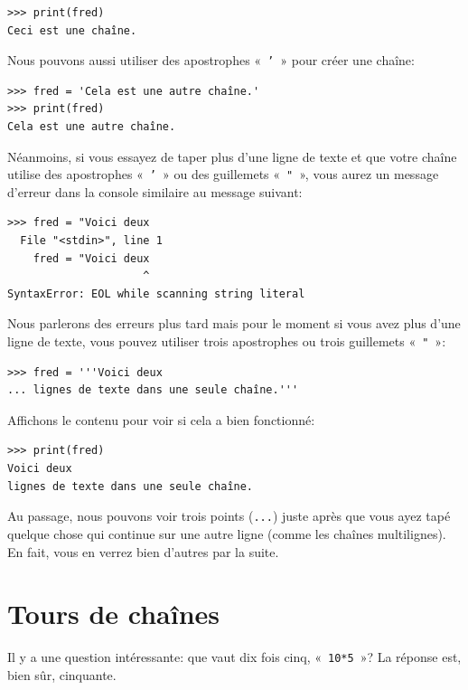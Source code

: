 \begin{Verbatim}[frame=single,rulecolor=\color{mbleu}, label=à taper]
>>> print(fred)
Ceci est une chaîne.
\end{Verbatim}

Nous pouvons aussi utiliser des apostrophes «~\texttt{'}~» pour créer une chaîne:

\begin{Verbatim}[frame=single,rulecolor=\color{mbleu}, label=à taper]
>>> fred = 'Cela est une autre chaîne.'
>>> print(fred)
Cela est une autre chaîne.
\end{Verbatim}

Néanmoins, si vous essayez de taper plus d'une ligne de texte et que votre chaîne utilise des apostrophes «~\texttt{'}~» ou des guillemets «~\texttt{"}~», vous aurez un message d'erreur dans la console similaire au message suivant:

\begin{Verbatim}[frame=single,rulecolor=\color{red}, label=erreur]
>>> fred = "Voici deux
  File "<stdin>", line 1
    fred = "Voici deux
                     ^
SyntaxError: EOL while scanning string literal
\end{Verbatim}
Nous parlerons des erreurs plus tard mais pour le moment si vous avez plus d'une ligne de texte,
vous pouvez utiliser trois apostrophes ou trois guillemets  «~\texttt{"}~»:

\begin{Verbatim}[frame=single,rulecolor=\color{mbleu}, label=à taper]
>>> fred = '''Voici deux
... lignes de texte dans une seule chaîne.'''
\end{Verbatim}

Affichons le contenu pour voir si cela a bien fonctionné:

\begin{Verbatim}[frame=single,rulecolor=\color{mbleu}, label=à taper]
>>> print(fred)
Voici deux
lignes de texte dans une seule chaîne.
\end{Verbatim}

Au passage, nous pouvons voir trois points (\verb+...+)  juste après que vous ayez tapé quelque chose qui continue
sur une autre ligne (comme les chaînes multilignes). En fait, vous en verrez bien d'autres par la suite.

\section{Tours de chaînes\label{sec:tours}}

Il y a une question intéressante: que vaut dix fois cinq, «~\verb+10*5+~»? La réponse est, bien sûr, cinquante.\\
  
